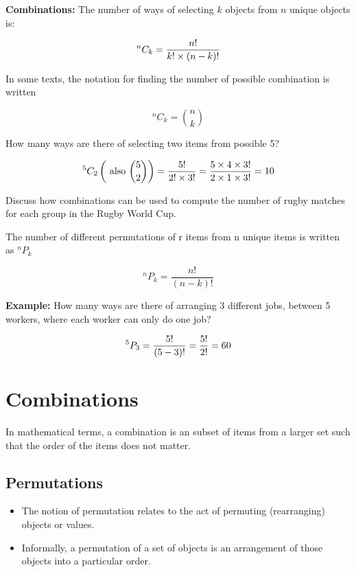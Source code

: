 \documentclass[12pt]{report}
\begin{document}
	{\Large
		
		\textbf{Combinations: }
		The number of ways of selecting $k$ objects from $n$ unique objects is:
		
		\[ ^n C_k = {n!  \over k! \times (n-k)!} \]
		
		In some texts, the notation for finding the number of possible combination is written
		
		\[ ^n C_k =  {n \choose k} \]
		
		How many ways are there of selecting two items from possible 5?
		
		\[ ^5 C_2   \left( \mbox{ also }  {5 \choose 2}  \right) =  {5!  \over 2! \times 3!} =  {5 \times 4 \times 3!  \over 2 \times 1 \times 3!} = 10  \]
		
		\bigskip
		Discuss how combinations can be used to compute the number of rugby matches for each group in the Rugby World Cup.
		
		The number of different permutations of r items from n unique items is written as $^n P_k$
		
		
		\[ ^n P_k = \frac{n!}{(n-k)!}\]

		\textbf{Example:}
		How many ways are there of arranging 3 different jobs, between 5 workers, where each worker can only do one job?
		
		
		\[ ^5 P_3 = \frac{5!}{(5-3)!}  = {5! \over 2!} = 60\]
		


\newpage		

		\section*{Combinations}
		In mathematical terms, a combination is an subset of items from a larger set such that the order of the items does not matter.
		
		\subsection{Permutations}
		\Large
		\begin{itemize}
			\item The notion of permutation relates to the act of permuting (rearranging) objects or values. 
			\item Informally, a permutation of a set of objects is an arrangement of those objects into a particular order. 
			

\end{itemize}}
\end{document}
